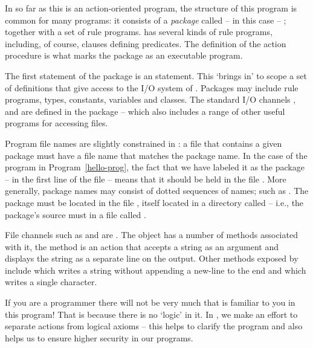 In so far as this is an action-oriented program, the structure of this program is common for many \go programs: it consists of a \emph{package} called -- in this case -- ; together with a set of rule programs. \go has several kinds of rule programs, including, of course, clauses defining predicates. The definition of the  action procedure is what marks the package as an executable program.

The first statement of the  package is an  statement. This `brings in' to scope a set of definitions that give access to the I/O system of \go. Packages may include rule programs, types, constants, variables and classes. The standard I/O channels ,  and  are defined in the  package -- which also includes a range of other useful programs for accessing files.

Program file names are slightly constrained in \go: a file that contains a given package must have a file name that matches the package name. In the case of the program in Program~\vref{hello-prog}, the fact that we have labeled it as the  package -- in the first line of the file -- means that it should be held in the file . More generally, package names may consist of dotted sequences of names; such as . The  package must be located in the file , itself located in a directory called  -- i.e., the  package's source must in a file called .

File channels such as  and  are . The  object has a number of methods associated with it, the  method is an action that accepts a string as an argument and displays the string as a separate line on the output. Other methods exposed by  include  which writes a string without appending a new-line to the end and  which writes a single character.

\begin{aside}
If you are a \prolog programmer there will not be very much that is familiar to you in this program! That is because there is no `logic' in it. In \go, we make an effort to separate actions from logical axioms -- this helps to clarify the program and also helps us to ensure higher security in our programs.
\end{aside}

